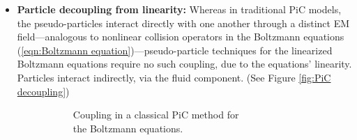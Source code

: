     \begin{itemize}
        \item  {\bf Particle decoupling from linearity:} Whereas in traditional PiC models, the pseudo-particles interact directly with one another through a distinct EM field---analogous to nonlinear collision operators in the Boltzmann equations (\ref{eqn:Boltzmann equation})---pseudo-particle techniques for the linearized Boltzmann equations require no such coupling, due to the equations' linearity. Particles interact indirectly, via the fluid component. (See Figure \ref{fig:PiC decoupling})
        
        \begin{figure}[!ht]
            \centering
            \begin{subfigure}{0.5\textwidth}
                \centering
                \caption{Coupling in a classical PiC method for \\ the Boltzmann equations.}
            \end{subfigure}%
            \begin{subfigure}{0.5\textwidth}
                \centering
\end{subfigure}
\end{figure}
\end{itemize}
